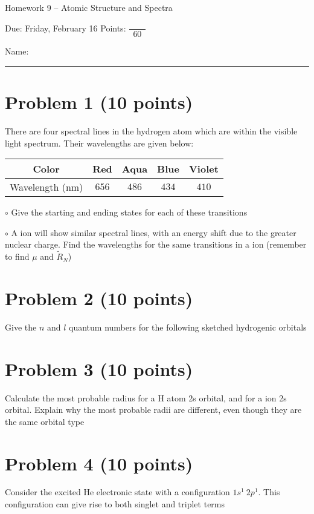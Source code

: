 \documentclass[10pt, letterpaper]{memoir}
\begin{document}
\begin{center}
	{\large Homework 9 -- Atomic Structure and Spectra}
	
	Due: Friday, February 16 \hspace{3em} Points: ${\dfrac{~}{~~60~~}}$
\end{center}

Name: \rule[-.1mm]{15em}{0.1pt}	
	
	\section*{Problem 1  (10 points)}
	There are four spectral lines in the hydrogen atom which are within the visible light spectrum. Their wavelengths are given below:
	
	\begin{tabular}{c|c|c|c|c}
		Color & Red & Aqua & Blue & Violet\\ \midrule
		Wavelength (nm) & $656$ & $486$ & $434$ & $410$
	\end{tabular}
	
	\noindent $\circ$ Give the starting and ending states for each of these transitions
	
	\vspace{18em}
	
	\noindent $\circ$ A  ion will show similar spectral lines, with an energy shift due to the greater nuclear charge. Find the wavelengths for the same transitions in a  ion (remember to find $\mu$ and $\tilde{R}_N$)
	
	\newpage	
	\section*{Problem 2 (10 points)}
	Give the $n$ and $l$ quantum numbers for the following sketched hydrogenic orbitals
	

	\vspace{20em}
	\section*{Problem 3 (10 points)}
	Calculate the most probable radius for a H atom 2s orbital, and for a  ion 2s orbital. Explain why the most probable radii are different, even though they are the same orbital type
	
	\newpage
	\section*{Problem 4 (10 points)}
	Consider the excited He electronic state with a configuration $1s^1~2p^1$. This configuration can give rise to both singlet and triplet terms
	
\end{document}
